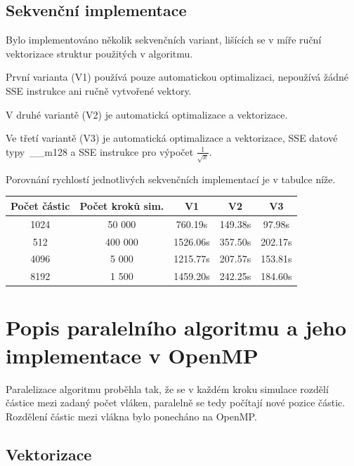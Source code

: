 \documentclass[12pt]{article}
\begin{document}
\subsection{Sekvenční implementace}

Bylo implementováno několik sekvenčních variant, lišících se v míře ruční vektorizace struktur použitých v algoritmu.

První varianta (V1) používá pouze automatickou optimalizaci, nepoužívá žádné SSE instrukce ani ručně vytvořené vektory.

V druhé variantě (V2) je automatická optimalizace a vektorizace. %

Ve třetí variantě (V3) je automatická optimalizace a vektorizace, SSE datové typy~\_\_m128 a SSE in\-struk\-ce pro výpočet ${\frac{1}{\sqrt{x}}}$.

Porovnání rychlostí jednotlivých sekvenčních implementací je v tabulce níže.

\begin{center}
\begin{tabular}{c | c | c | c | c}
\textbf{Počet částic} & \textbf{Počet kroků sim.}  & \textbf{V1} & \textbf{V2} & \textbf{V3} \\ \hline \hline
1024 & 50 000 & 760.19s & 149.38s & 97.98s \\ \hline
512 & 400 000 & 1526.06s & 357.50s & 202.17s \\ \hline
4096 & 5 000 & 1215.77s & 207.57s & 153.81s \\ \hline
8192 & 1 500 & 1459.20s & 242.25s & 184.60s \\ \hline
\end{tabular}
\end{center}

\section{Popis paralelního algoritmu a jeho implementace v OpenMP}
Paralelizace algoritmu proběhla tak, že se v každém kroku simulace rozdělí částice mezi zadaný počet vláken, paralelně se tedy počítají nové pozice částic.
Rozdělení částic mezi vlákna bylo ponecháno na OpenMP.

\subsection{Vektorizace}
\end{document}
